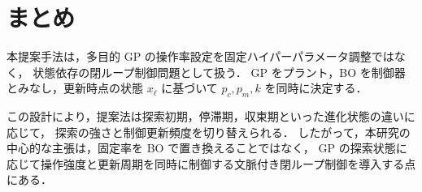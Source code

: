 \documentclass[a4paper,11pt]{ltjsarticle}
\begin{document}
\section{まとめ}

本提案手法は，多目的 GP の操作率設定を固定ハイパーパラメータ調整ではなく，
状態依存の閉ループ制御問題として扱う．
GP をプラント，BO を制御器とみなし，更新時点の状態 \(x_\ell\) に基づいて
\(p_c,p_m,k\) を同時に決定する．

この設計により，提案法は探索初期，停滞期，収束期といった進化状態の違いに応じて，
探索の強さと制御更新頻度を切り替えられる．
したがって，本研究の中心的な主張は，固定率を BO で置き換えることではなく，
GP の探索状態に応じて操作強度と更新周期を同時に制御する文脈付き閉ループ制御を導入する点にある．
\end{document}
